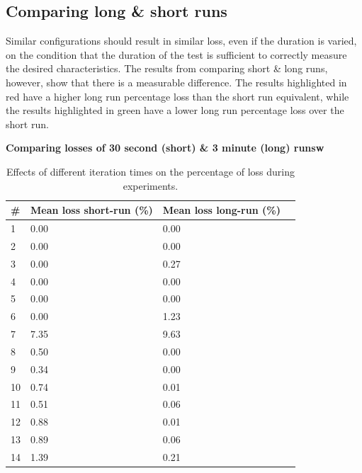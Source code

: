 \documentclass[]{article}
\begin{document}
\subsection{Comparing long \& short runs}
Similar configurations should result in similar loss, even if the duration is varied, on the condition that the duration of the test is sufficient to correctly measure the desired characteristics. The results from comparing short \& long runs, however, show that there is a measurable difference. The results highlighted in red have a higher long run percentage loss than the short run equivalent, while the results highlighted in green have a lower long run percentage loss over the short run.

\begin{table}[H]
	\textbf{Comparing losses of 30 second (short) \& 3 minute (long) runsw}	
	\begin{center}
		\begin{tabular}{ | l | l | l | l | }
			\hline
			\textbf{\#} & \textbf{Mean loss short-run (\%)} & \textbf{Mean loss long-run (\%)} \\ \hline
			
			1 & 0.00 & 0.00 \\ \hline
			2 & 0.00 & 0.00 \\ \hline
			\rowcolor{red}
			3 & 0.00 & 0.27 \\ \hline
			4 & 0.00 & 0.00 \\ \hline
			5 & 0.00 & 0.00 \\ \hline
			\rowcolor{red}
			6 & 0.00 & 1.23 \\ \hline
			\rowcolor{red}
			7 & 7.35 & 9.63 \\ \hline
			\rowcolor{green}
			8 & 0.50 & 0.00 \\ \hline
			\rowcolor{green}
			9 & 0.34 & 0.00 \\ \hline
			\rowcolor{green}
			10 & 0.74 & 0.01 \\ \hline
			\rowcolor{green}
			11 & 0.51 & 0.06 \\ \hline
			\rowcolor{green}
			12 & 0.88 & 0.01 \\ \hline
			\rowcolor{green}
			13 & 0.89 & 0.06 \\ \hline
			\rowcolor{green}
			14 & 1.39 & 0.21 \\ \hline
		\end{tabular}
		\caption{Effects of different iteration times on the percentage of loss during experiments.}
		\label{tab:resultsroundabsolute}
	\end{center}
\end{table}
\end{document}
